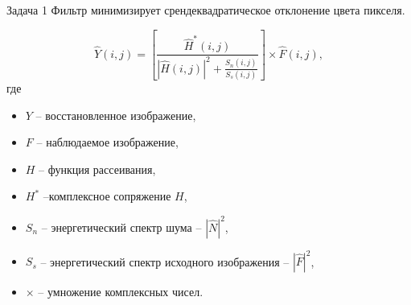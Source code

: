
\begin{frame}{Задача 1}
    Фильтр минимизирует срендеквадратическое отклонение цвета пикселя.
    
    \begin{equation*}\label{eq:wiener_nsr}
    \hat{Y}(i, j) = \left[ \frac{\hat{H}^*(i, j)}{\left|\hat{H}(i, j)\right|^2 + \frac{S_n(i, j)}{S_s(i, j)}} \right] \times \hat{F}(i, j),
    \end{equation*}
где
\begin{itemize}[noitemsep]
    \item $Y$ -- восстановленное изображение,
    \item $F$ -- наблюдаемое изображение,
    \item $H$ -- функция рассеивания,
    \item $H^*$ --комплексное сопряжение $H$,  
    \item $S_n$ -- энергетический спектр шума -- $\left| \hat{N} \right|^2$,
    \item $S_s$ -- энергетический спектр исходного изображения -- $\left| \hat{F} \right|^2$,
    \item $\times$ -- умножение комплексных чисел.
\end{itemize}
\end{frame}